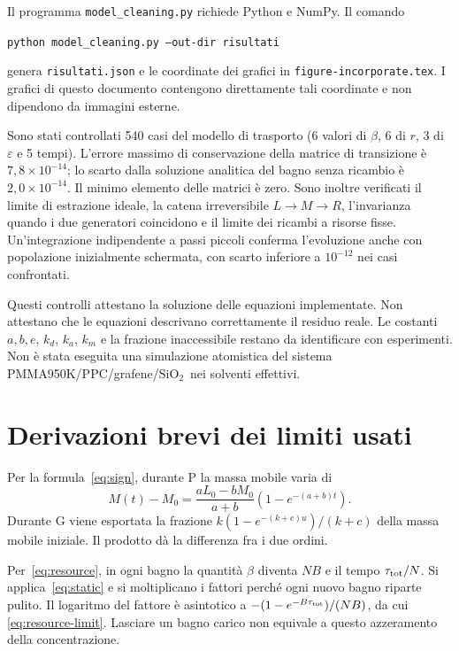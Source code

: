 \documentclass[11pt,reqno]{amsart}
\numberwithin{equation}{section}
\newcommand{\SiO}{\ensuremath{\mathrm{SiO}_2}}
\begin{document}
Il programma \texttt{model\_cleaning.py} richiede Python e NumPy.
Il comando
\begin{center}
\texttt{python model\_cleaning.py --out-dir risultati}
\end{center}
genera \texttt{risultati.json} e le coordinate dei grafici
in \texttt{figure-incorporate.tex}. I grafici di questo
documento contengono direttamente tali coordinate e non
dipendono da immagini esterne.

Sono stati controllati 540 casi del modello di trasporto
(6 valori di $\beta$, 6 di $r$, 3 di $\varepsilon$ e 5 tempi).
L'errore massimo di conservazione della matrice di transizione
\`e $7{,}8\times10^{-14}$; lo scarto dalla soluzione analitica
del bagno senza ricambio \`e $2{,}0\times10^{-14}$.
Il minimo elemento delle matrici \`e zero. Sono inoltre
verificati il limite di estrazione ideale, la catena
irreversibile $L\to M\to R$, l'invarianza quando i due
generatori coincidono e il limite dei ricambi a risorse fisse.
Un'integrazione indipendente a passi piccoli conferma
l'evoluzione anche con popolazione inizialmente schermata,
con scarto inferiore a $10^{-12}$ nei casi confrontati.

Questi controlli attestano la soluzione delle equazioni
implementate. Non attestano che le equazioni descrivano
correttamente il residuo reale. Le costanti $a,b,e$, $k_d$,
$k_a$, $k_m$ e la frazione inaccessibile restano da identificare
con esperimenti. Non \`e stata eseguita una simulazione
atomistica del sistema PMMA950K/PPC/grafene/\SiO\ nei
solventi effettivi.

\section{Derivazioni brevi dei limiti usati}

Per la formula~\eqref{eq:sign}, durante P la massa mobile
varia di
\[
 M(t)-M_0=\frac{aL_0-bM_0}{a+b}
                 (1-e^{-(a+b)t}).
\]
Durante G viene esportata la frazione
$k(1-e^{-(k+c)u})/(k+c)$ della massa mobile iniziale.
Il prodotto d\`a la differenza fra i due ordini.

Per~\eqref{eq:resource}, in ogni bagno la quantit\`a
$\beta$ diventa $NB$ e il tempo $\tau_{\rm tot}/N$.
Si applica~\eqref{eq:static} e si moltiplicano i fattori
perch\'e ogni nuovo bagno riparte pulito. Il logaritmo del
fattore \`e asintotico a
$-(1-e^{-B\tau_{\rm tot}})/(NB)$, da cui
\eqref{eq:resource-limit}. Lasciare un bagno carico non
equivale a questo azzeramento della concentrazione.
\end{document}
